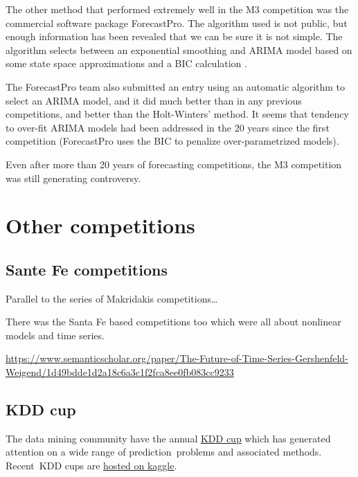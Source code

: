 \documentclass[11pt,a4paper,]{article}
\begin{document}
The other method that performed extremely well in the M3 competition was the commercial software package ForecastPro. The algorithm used is not public, but enough information has been revealed that we can be sure it is not simple. The algorithm selects between an exponential smoothing and ARIMA model based on some state space approximations and a BIC calculation \autocite{Goodrich2000}.

The ForecastPro team also submitted an entry using an automatic algorithm to select an ARIMA model, and it did much better than in any previous competitions, and better than the Holt-Winters' method. It seems that tendency to over-fit ARIMA models had been addressed in the 20 years since the first competition (ForecastPro uses the BIC to penalize over-parametrized models).

Even after more than 20 years of forecasting competitions, the M3 competition was still generating controversy.

\hypertarget{other-competitions}{%
\section{Other competitions}\label{other-competitions}}

\hypertarget{sante-fe-competitions}{%
\subsection*{Sante Fe competitions}\label{sante-fe-competitions}}

Parallel to the series of Makridakis competitions\ldots{}

There was the Santa Fe based competitions too which were all about nonlinear models and time series.

\url{https://www.semanticscholar.org/paper/The-Future-of-Time-Series-Gershenfeld-Weigend/1d49bdde1d2a18c6a3c1f2fca8ee0fb083cc9233}

\hypertarget{kdd-cup}{%
\subsection*{KDD cup}\label{kdd-cup}}

The data mining community have the annual \href{http://kdd.org/kdd-cup}{KDD cup} which has generated attention on a wide range of prediction~problems and associated methods. Recent~KDD cups are \href{https://www.kaggle.com/c/kdd-cup-2014-predicting-excitement-at-donors-choose}{hosted on kaggle}.
\end{document}
